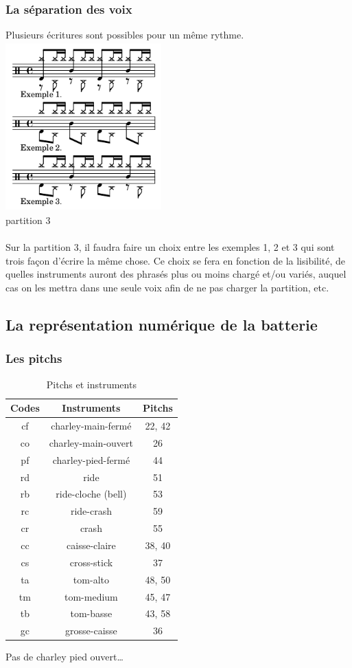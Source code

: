 \subsubsection{La séparation des voix}
Plusieurs écritures sont possibles pour un même rythme.
\includegraphics[height=65mm, width=60mm]{z_images/1_description_notation/separation/0_exemples_separation.png}\\
partition 3\\\\
Sur la partition 3, il faudra faire un choix entre les exemples 1, 2 et 3 qui sont trois façon d’écrire la même chose. Ce choix se fera en fonction de la lisibilité, de quelles instruments auront des phrasés plus ou moins chargé et/ou variés, auquel cas on les mettra dans une seule voix afin de ne pas charger la partition, etc. 
\subsection*{La représentation numérique de la batterie}
\subsubsection{Les pitchs}
\begin{table}[h]
	\centering
	\begin{tabular}{|c|c|c|} \hline
		Codes & Instruments & Pitchs \\ \hline
		cf & charley-main-fermé & 22, 42 \\
		co & charley-main-ouvert & 26 \\
		pf & charley-pied-fermé & 44 \\
		rd & ride & 51 \\
		rb & ride-cloche (bell) & 53 \\
		rc & ride-crash & 59 \\
		cr & crash & 55 \\
		cc & caisse-claire & 38, 40 \\
		cs & cross-stick & 37 \\
		ta & tom-alto & 48, 50 \\
		tm & tom-medium & 45, 47 \\
		tb & tom-basse & 43, 58 \\
		gc & grosse-caisse & 36 \\ \hline
	\end{tabular}
	\caption{Pitchs et instruments}
\end{table}
Pas de charley pied ouvert…
